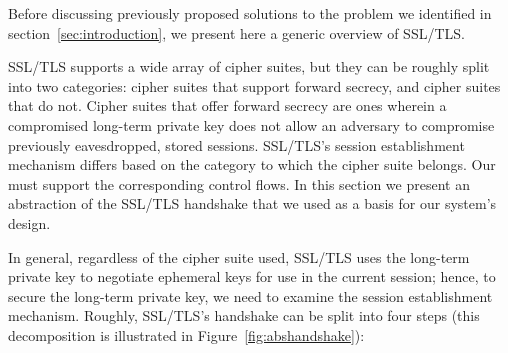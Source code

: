\documentclass[../main.tex]{subfiles}
\begin{document}
\label{sec:ssloverview}
Before discussing previously proposed solutions to the problem we
identified in section~\ref{sec:introduction}, we present here a
generic overview of SSL/TLS.

SSL/TLS supports a wide array of cipher suites, but they can be
roughly split into two categories: cipher suites that support forward
secrecy, and cipher suites that do not. Cipher suites that offer
forward secrecy are ones wherein a compromised long-term private key
does not allow an adversary to compromise previously eavesdropped,
stored sessions. SSL/TLS's session establishment mechanism differs
based on the category to which the cipher suite belongs. Our must
support the corresponding control flows. In this section we present an
abstraction of the SSL/TLS handshake that we used as a basis for our
system's design.

In general, regardless of the cipher suite used, SSL/TLS uses the
long-term private key to negotiate ephemeral keys for use in the
current session; hence, to secure the long-term private key, we need
to examine the session establishment mechanism. Roughly, SSL/TLS's
handshake can be split into four steps (this decomposition is
illustrated in Figure~\ref{fig:abshandshake}):
\end{document}
